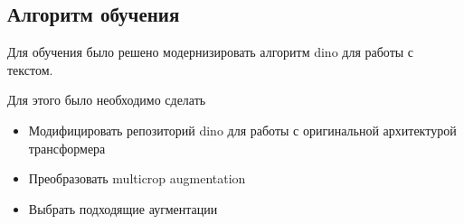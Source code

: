 \documentclass[../part_2.tex]{subfiles}
\begin{document}
    \subsection{Алгоритм обучения}
    \par Для обучения было решено модернизировать алгоритм dino для работы с текстом.
    \par Для этого было необходимо сделать
    \begin{itemize}
        \item Модифицировать репозиторий \acrshort{dino} для работы с оригинальной архитектурой трансформера
        \item Преобразовать multicrop augmentation
        \item Выбрать подходящие аугментации
    \end{itemize}
\end{document}
